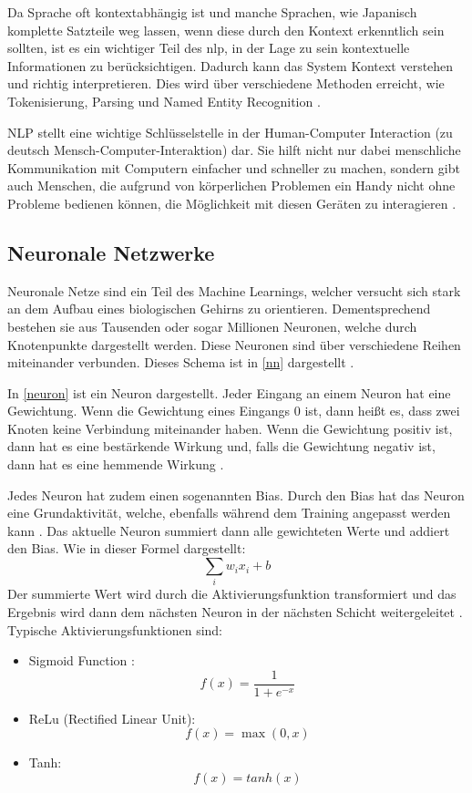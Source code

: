Da Sprache oft kontextabhängig ist und manche Sprachen, wie Japanisch 
komplette Satzteile weg lassen, wenn diese durch den Kontext erkenntlich 
sein sollten, ist es
ein wichtiger Teil des \ac*{nlp}, in der Lage zu sein kontextuelle
Informationen zu berücksichtigen. Dadurch kann das System Kontext verstehen
und richtig interpretieren. Dies wird über verschiedene Methoden erreicht, wie
Tokenisierung, Parsing und Named Entity Recognition \cite{WhatNLPNatural2021}.\par

NLP stellt eine wichtige Schlüsselstelle in der Human-Computer Interaction 
(zu deutsch Mensch-Computer-Interaktion) dar. Sie hilft nicht nur dabei
menschliche Kommunikation mit Computern einfacher und schneller zu machen,
sondern gibt auch Menschen, die aufgrund von körperlichen 
Problemen ein Handy nicht ohne Probleme bedienen können, die Möglichkeit 
mit diesen Geräten zu interagieren \cite{WhatNLPNatural2021}. 



\subsection{Neuronale Netzwerke}
\label{s:intro:nn}
Neuronale Netze sind ein Teil des Machine Learnings, welcher versucht sich stark an dem Aufbau eines biologischen Gehirns zu orientieren.
Dementsprechend bestehen sie aus Tausenden oder sogar Millionen Neuronen, welche durch Knotenpunkte dargestellt werden. Diese Neuronen
sind über verschiedene Reihen miteinander verbunden. Dieses Schema ist in \ref*{nn} dargestellt \cite[S. 5 - 7]{Goodfellow-et-al-2016}.\par

In \ref{neuron} ist ein Neuron dargestellt. Jeder Eingang an einem Neuron hat eine Gewichtung. Wenn die Gewichtung eines Eingangs 0 ist, dann heißt es, dass zwei Knoten 
keine Verbindung miteinander haben. Wenn die Gewichtung positiv ist, dann hat es eine bestärkende Wirkung und, falls die Gewichtung negativ
ist, dann hat es eine hemmende Wirkung \cite[S. 5 - 7]{Goodfellow-et-al-2016}. \par %
Jedes Neuron hat zudem einen sogenannten Bias. Durch den Bias hat das Neuron eine Grundaktivität, welche, ebenfalls während dem Training angepasst werden kann \cite{kempkesNeuronUndAktivierungsfunktion2023}.
Das aktuelle Neuron summiert dann alle gewichteten Werte und addiert den Bias. Wie in dieser Formel dargestellt:
\[
\sum_{i} w_i x_i + b
\] 
Der summierte Wert wird durch die Aktivierungsfunktion transformiert und das Ergebnis wird dann dem nächsten Neuron in der nächsten Schicht weitergeleitet \cite[S. 5 - 7]{Goodfellow-et-al-2016}.
Typische Aktivierungsfunktionen \cite{kempkesNeuronUndAktivierungsfunktion2023} sind:
\begin{itemize}
    \item Sigmoid Function : \[f(x) = \frac{1}{1 + e^{-x}}\]
    \item ReLu (Rectified Linear Unit): \[f(x) = \max(0, x)\]
    \item Tanh: \[f(x)=tanh(x)\]
\end{itemize}

